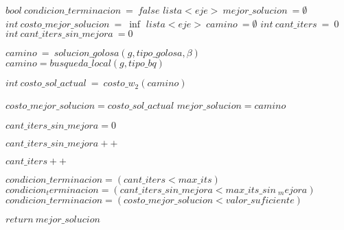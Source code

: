 \begin{algorithmic}


	\Statex
	\State $bool \: condicion\_terminacion\: =\: false$
    \State $lista<eje> \:mejor\_solucion\: = \emptyset$
    \State $int \:costo\_mejor\_solucion\: =\: \inf$
    \State $lista<eje> \:camino\: = \emptyset$
    \State $int\: cant\_iters \:= \:0$
    \State $int\: cant\_iters\_sin\_mejora \:= 0$


    	\State $camino\: =\: solucion\_golosa(g, tipo\_golosa, \beta)$
    			\State $camino = busqueda\_local(g, tipo\_bq)$
    	\EndWhile

    	\State $ int \:  costo\_sol\_actual \: = \: costo\_w_2(camino)$


            \State $costo\_mejor\_solucion = costo\_sol\_actual$
            \State $mejor\_solucion = camino$
            
            \State $cant\_iters\_sin\_mejora = 0$
        \Else
            
            \State $cant\_iters\_sin\_mejora++$
        \EndIf

        \State $cant\_iters++$
    

           \State $condicion\_terminacion = (cant\_iters < max\_its)$            
            \State $condicion_terminacion = (cant\_iters\_sin\_mejora < max\_its\_sin\ _mejora)$
            \State $condicion\_terminacion = (costo\_mejor\_solucion < valor\_suficiente)$
        \EndIf

       \EndWhile

       \State $return\:  mejor\_solucion$

\EndProcedure
\end{algorithmic}
